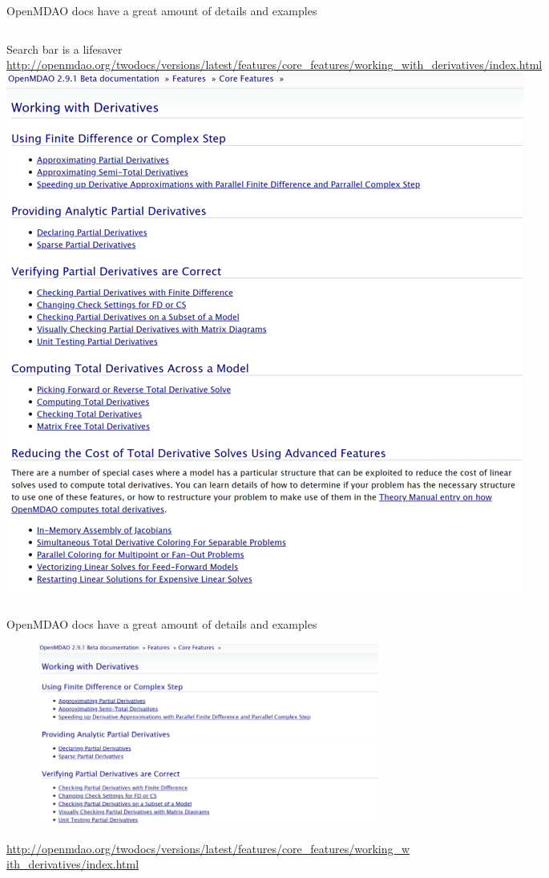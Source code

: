 \documentclass[aspectratio=169, usenames,dvipsnames, 14pt]{beamer}
\begin{document}
\begin{frame}{OpenMDAO docs have a great amount of details and examples}

	\begin{columns}
			Search bar is a lifesaver
			\newline \newline \newline \newline \url{http://openmdao.org/twodocs/versions/latest/features/core_features/working_with_derivatives/index.html}
			\includegraphics[scale=.37]{images/slide_24_derivatives.png}
	\end{columns}

\end{frame}

\begin{frame}{OpenMDAO docs have a great amount of details and examples}

	\begin{figure}
		\includegraphics[scale=.4]{images/slide_25_derivatives.png}
	\end{figure}
	\url{http://openmdao.org/twodocs/versions/latest/features/core_features/working_with_derivatives/index.html}
	
\end{frame}
\end{document}

